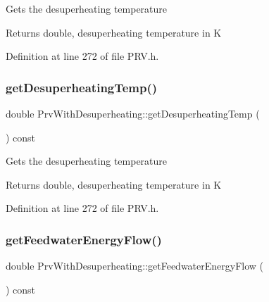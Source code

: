 Gets the desuperheating temperature

\begin{DoxyReturn}{Returns}
double, desuperheating temperature in K 
\end{DoxyReturn}


Definition at line 272 of file P\+R\+V.\+h.

\mbox{\label{class_prv_with_desuperheating_af334a9ff9a14d110cb2851a76d5d84fb}} 
\subsubsection{\texorpdfstring{get\+Desuperheating\+Temp()}{getDesuperheatingTemp()}\hspace{0.1cm}{\footnotesize\ttfamily [3/3]}}
{\footnotesize\ttfamily double Prv\+With\+Desuperheating\+::get\+Desuperheating\+Temp (\begin{DoxyParamCaption}{ }\end{DoxyParamCaption}) const\hspace{0.3cm}{\ttfamily [inline]}}

Gets the desuperheating temperature

\begin{DoxyReturn}{Returns}
double, desuperheating temperature in K 
\end{DoxyReturn}


Definition at line 272 of file P\+R\+V.\+h.

\mbox{\label{class_prv_with_desuperheating_a42945a77fcdbaf1e1844c444c696f8b0}} 
\subsubsection{\texorpdfstring{get\+Feedwater\+Energy\+Flow()}{getFeedwaterEnergyFlow()}\hspace{0.1cm}{\footnotesize\ttfamily [1/3]}}
{\footnotesize\ttfamily double Prv\+With\+Desuperheating\+::get\+Feedwater\+Energy\+Flow (\begin{DoxyParamCaption}{ }\end{DoxyParamCaption}) const\hspace{0.3cm}{\ttfamily [inline]}}

